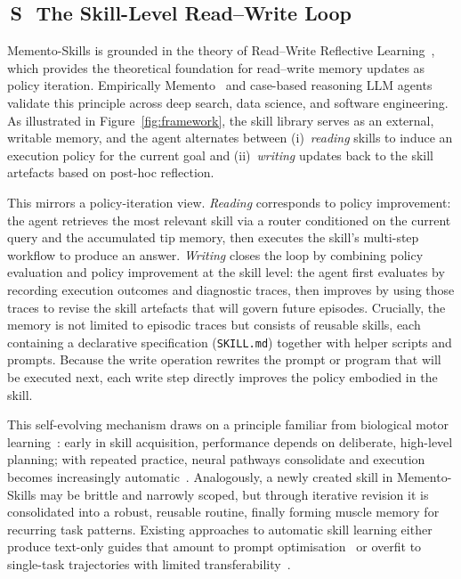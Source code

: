 \documentclass[11pt,a4paper]{article}
\newcommand{\Stag}{{\sffamily\bfseries\colorbox{sharedBG}{\color{black!60}\,S\,}}}
\begin{document}
\subsection{\Stag~The Skill-Level Read--Write Loop}
\label{sec:readwrite-shared}


Memento-Skills is grounded in the theory of Read--Write Reflective Learning~\cite{wang2025memento2}, which provides the theoretical foundation for read--write memory updates as policy iteration. Empirically Memento~\cite{zhou2025memento} and case-based reasoning LLM agents~\cite{guo2024ds,guo2025optimizing} validate this principle across 
deep search, data science, and software engineering. As illustrated in Figure~\ref{fig:framework}, the skill library serves as an external, writable memory, and the agent alternates between (i)~\emph{reading} skills to induce an execution policy for the current goal and (ii)~\emph{writing} updates back to the skill artefacts based on post-hoc reflection. 

This mirrors a policy-iteration view. \emph{Reading} corresponds to policy improvement: the agent retrieves the most relevant skill via a router conditioned on the current query and the accumulated tip memory, then executes the skill's multi-step workflow to produce an answer. \emph{Writing} closes the loop by combining policy evaluation and policy improvement at the skill level: the agent first evaluates by recording execution outcomes and diagnostic traces, then improves by using those traces to revise the skill artefacts that will govern future episodes. Crucially, the memory is not limited to episodic traces but consists of reusable skills, each containing a declarative specification (\texttt{SKILL.md}) together with helper scripts and prompts. Because the write operation rewrites the prompt or program that will be executed next, each write step directly improves the policy embodied in the skill.

This self-evolving mechanism draws on a principle familiar from biological motor learning~\cite{magill2010motor}: early in skill acquisition, performance depends on deliberate, high-level planning; with repeated practice, neural pathways consolidate and execution becomes increasingly automatic~\cite{bacmeister2022motor}. Analogously, a newly created skill in Memento-Skills may be brittle and narrowly scoped, but through iterative revision it is consolidated into a robust, reusable routine, finally forming muscle memory for recurring task patterns. Existing approaches to automatic skill learning either produce text-only guides that amount to prompt optimisation~\cite{agrawal2025gepareflectivepromptevolution,tan2026gskill,mi2026procmem} or overfit to single-task trajectories with limited transferability~\cite{letta2025skilllearning}. 
\end{document}
